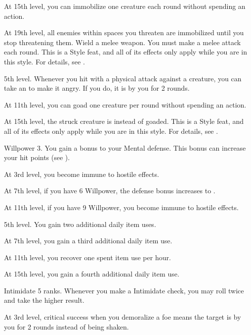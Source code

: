     At 15th level, you can immobilize one creature each round without spending an action.

    At 19th level, all enemies within spaces you threaten are immobilized until you stop threatening them.
    \stylereq Wield a melee weapon.
    You must make a melee attack each round.
     This is a Style feat, and all of its effects only apply while you are in this style.
    For details, see .

    \featpre 5th level.
    \featben Whenever you hit with a physical attack against a creature, you can take an  to make it angry.
    If you do, it is \goaded by you for 2 rounds.

    At 11th level, you can goad one creature per round without spending an action.

    At 15th level, the struck creature is \taunted instead of goaded.
     This is a Style feat, and all of its effects only apply while you are in this style.
    For details, see .

    \featpre Willpower 3.
    \featben You gain a  bonus to your Mental defense.
    This bonus can increase your hit points (see ).

    At 3rd level, you become immune to hostile  effects.

    At 7th level, if you have 6 Willpower, the defense bonus increases to .

    At 11th level, if you have 9 Willpower, you become immune to hostile  effects.

    \featpre 5th level.
    \featben You gain two additional daily item uses.

    At 7th level, you gain a third additional daily item use.

    At 11th level, you recover one spent item use per hour.

    At 15th level, you gain a fourth additional daily item use.

    \featpre Intimidate 5 ranks.
    \featben Whenever you make a Intimidate check, you may roll twice and take the higher result.

    At 3rd level, critical success when you demoralize a foe means the target is \frightened by you for 2 rounds instead of being shaken.

